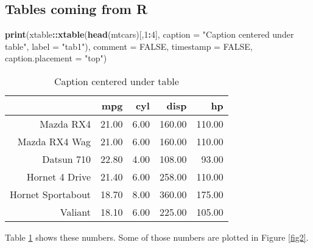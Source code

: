 \documentclass[useAMS,usenatbib,referee]{biom}
\newenvironment{Shaded}{\begin{snugshade}}{\end{snugshade}}
\newcommand{\AttributeTok}[1]{\textcolor[rgb]{0.13,0.29,0.53}{#1}}
\newcommand{\ConstantTok}[1]{\textcolor[rgb]{0.56,0.35,0.01}{#1}}
\newcommand{\DecValTok}[1]{\textcolor[rgb]{0.00,0.00,0.81}{#1}}
\newcommand{\FunctionTok}[1]{\textcolor[rgb]{0.13,0.29,0.53}{\textbf{#1}}}
\newcommand{\NormalTok}[1]{#1}
\newcommand{\SpecialCharTok}[1]{\textcolor[rgb]{0.81,0.36,0.00}{\textbf{#1}}}
\newcommand{\StringTok}[1]{\textcolor[rgb]{0.31,0.60,0.02}{#1}}
\begin{document}
\clearpage

\hypertarget{tables-coming-from-r}{%
\subsection{Tables coming from R}\label{tables-coming-from-r}}

\begin{Shaded}
\begin{Highlighting}[]
\FunctionTok{print}\NormalTok{(xtable}\SpecialCharTok{::}\FunctionTok{xtable}\NormalTok{(}\FunctionTok{head}\NormalTok{(mtcars)[,}\DecValTok{1}\SpecialCharTok{:}\DecValTok{4}\NormalTok{], }
\AttributeTok{caption =} \StringTok{"Caption centered under table"}\NormalTok{, }\AttributeTok{label =} \StringTok{"tab1"}\NormalTok{), }
\AttributeTok{comment =} \ConstantTok{FALSE}\NormalTok{, }\AttributeTok{timestamp =} \ConstantTok{FALSE}\NormalTok{, }\AttributeTok{caption.placement =} \StringTok{"top"}\NormalTok{)}
\end{Highlighting}
\end{Shaded}

\begin{table}[ht]
\centering
\caption{Caption centered under table} 
\label{tab1}
\begin{tabular}{rrrrr}
  \hline
 & mpg & cyl & disp & hp \\ 
  \hline
Mazda RX4 & 21.00 & 6.00 & 160.00 & 110.00 \\ 
  Mazda RX4 Wag & 21.00 & 6.00 & 160.00 & 110.00 \\ 
  Datsun 710 & 22.80 & 4.00 & 108.00 & 93.00 \\ 
  Hornet 4 Drive & 21.40 & 6.00 & 258.00 & 110.00 \\ 
  Hornet Sportabout & 18.70 & 8.00 & 360.00 & 175.00 \\ 
  Valiant & 18.10 & 6.00 & 225.00 & 105.00 \\ 
   \hline
\end{tabular}
\end{table}

Table \ref{tab1} shows these numbers. Some of those numbers are plotted
in Figure \ref{fig2}.






\label{lastpage}
\end{document}
